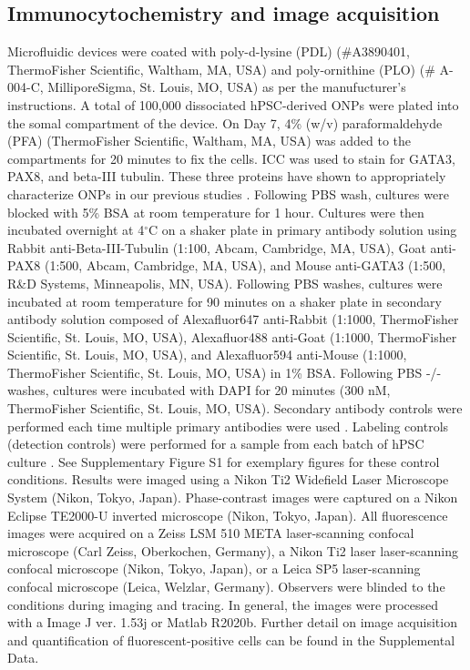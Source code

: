 \documentclass[review]{elsarticle}
\begin{document}
\subsection{Immunocytochemistry and image acquisition}
Microfluidic devices were coated with poly-d-lysine (PDL) (\#A3890401, ThermoFisher Scientific, Waltham, MA, USA) and poly-ornithine (PLO) (\# A-004-C, MilliporeSigma, St. Louis, MO, USA) as per the manufucturer’s instructions. A total of 100,000 dissociated hPSC-derived ONPs were plated into the somal compartment of the device. On Day 7, 4\% (w/v) paraformaldehyde (PFA) (ThermoFisher Scientific, Waltham, MA, USA) was added to the compartments for 20 minutes to fix the cells. ICC was used to stain for GATA3, PAX8, and beta-III tubulin. These three proteins have shown to appropriately characterize ONPs in our previous studies \cite{Heuer2021, Chang2020, Matsuoka2017}. Following PBS wash, cultures were blocked with 5\% BSA at room temperature for 1 hour. Cultures were then incubated overnight at 4$^\circ$C on a shaker plate in primary antibody solution using Rabbit anti-Beta-III-Tubulin (1:100, Abcam, Cambridge, MA, USA), Goat anti-PAX8 (1:500, Abcam, Cambridge, MA, USA), and Mouse anti-GATA3 (1:500, R\&D Systems, Minneapolis, MN, USA). Following PBS washes, cultures were incubated at room temperature for 90 minutes on a shaker plate in secondary antibody solution composed of Alexafluor647 anti-Rabbit (1:1000, ThermoFisher Scientific, St. Louis, MO, USA), Alexafluor488 anti-Goat (1:1000, ThermoFisher Scientific, St. Louis, MO, USA), and Alexafluor594 anti-Mouse (1:1000, ThermoFisher Scientific, St. Louis, MO, USA) in 1\% BSA. Following PBS -/- washes, cultures were incubated with DAPI for 20 minutes (300 nM, ThermoFisher Scientific, St. Louis, MO, USA). Secondary antibody controls were performed each time multiple primary antibodies were used \cite{Burry2011}. Labeling controls (detection controls) were performed for a sample from each batch of hPSC culture \cite{Burry2011}. See Supplementary Figure S1 for exemplary figures for these control conditions. Results were imaged using a Nikon Ti2 Widefield Laser Microscope System (Nikon, Tokyo, Japan). Phase-contrast images were captured on a Nikon Eclipse TE2000-U inverted microscope (Nikon, Tokyo, Japan). All fluorescence images were acquired on a Zeiss LSM 510 META laser-scanning confocal microscope (Carl Zeiss, Oberkochen, Germany), a Nikon Ti2 laser laser-scanning confocal microscope (Nikon, Tokyo, Japan), or a Leica SP5 laser-scanning confocal microscope (Leica, Welzlar, Germany). Observers were blinded to the conditions during imaging and tracing. In general, the images were processed with a Image J  ver. 1.53j or Matlab R2020b. Further detail on image acquisition and quantification of fluorescent-positive cells can be found in the Supplemental Data. 
\end{document}
